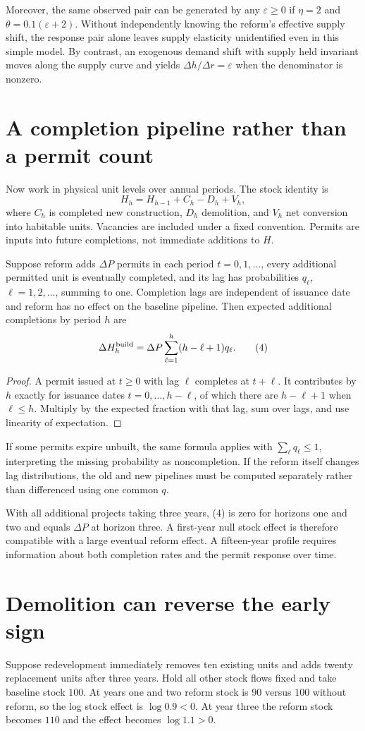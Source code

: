 \documentclass[11pt,a4paper]{article}
\begin{document}
Moreover, the same observed pair can be generated by any $\varepsilon\ge0$ if $\eta=2$ and $\theta=0.1(\varepsilon+2)$. Without independently knowing the reform's effective supply shift, the response pair alone leaves supply elasticity unidentified even in this simple model. By contrast, an exogenous demand shift with supply held invariant moves along the supply curve and yields $\Delta h/\Delta r=\varepsilon$ when the denominator is nonzero.
\section{A completion pipeline rather than a permit count}
Now work in physical unit levels over annual periods. The stock identity is
\[
 H_h=H_{h-1}+C_h-D_h+V_h,
 \tag{3}
\]
where $C_h$ is completed new construction, $D_h$ demolition, and $V_h$ net conversion into habitable units. Vacancies are included under a fixed convention. Permits are inputs into future completions, not immediate additions to $H$.

Suppose reform adds $\Delta P$ permits in each period $t=0,1,\ldots$, every additional permitted unit is eventually completed, and its lag has probabilities $q_\ell$, $\ell=1,2,\ldots$, summing to one. Completion lags are independent of issuance date and reform has no effect on the baseline pipeline. Then expected additional completions by period $h$ are
\[
 \Delta H_h^{\rm build}
 =\Delta P\sum_{\ell=1}^{h}(h-\ell+1)q_\ell.
 \tag{4}
\]
\begin{proof}
A permit issued at $t\ge0$ with lag $\ell$ completes at $t+\ell$. It contributes by $h$ exactly for issuance dates $t=0,\ldots,h-\ell$, of which there are $h-\ell+1$ when $\ell\le h$. Multiply by the expected fraction with that lag, sum over lags, and use linearity of expectation.
\end{proof}
If some permits expire unbuilt, the same formula applies with $\sum_\ell q_\ell\le1$, interpreting the missing probability as noncompletion. If the reform itself changes lag distributions, the old and new pipelines must be computed separately rather than differenced using one common $q$.

With all additional projects taking three years, (4) is zero for horizons one and two and equals $\Delta P$ at horizon three. A first-year null stock effect is therefore compatible with a large eventual reform effect. A fifteen-year profile requires information about both completion rates and the permit response over time.
\section{Demolition can reverse the early sign}
Suppose redevelopment immediately removes ten existing units and adds twenty replacement units after three years. Hold all other stock flows fixed and take baseline stock $100$. At years one and two reform stock is $90$ versus $100$ without reform, so the log stock effect is $\log0.9<0$. At year three the reform stock becomes $110$ and the effect becomes $\log1.1>0$.
\end{document}
